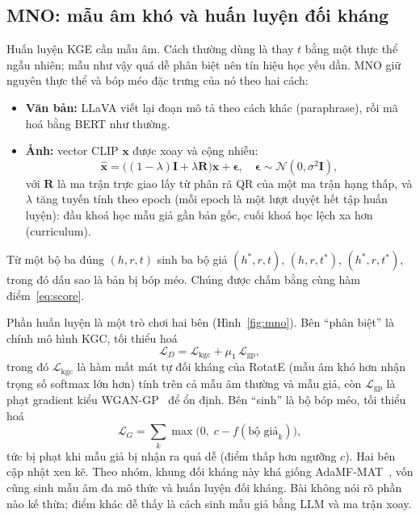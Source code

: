 \documentclass[conference,a4paper]{IEEEtran}
\begin{document}
\subsection{MNO: mẫu âm khó và huấn luyện đối kháng}
\label{sec:hfr-mno}

Huấn luyện KGE cần mẫu âm. Cách thường dùng là thay $t$ bằng một thực thể ngẫu nhiên; mẫu như vậy quá dễ phân biệt nên tín hiệu học yếu dần. MNO giữ nguyên thực thể và bóp méo đặc trưng của nó theo hai cách:

\begin{itemize}
\item \textbf{Văn bản:} LLaVA viết lại đoạn mô tả theo cách khác (paraphrase), rồi mã hoá bằng BERT như thường.
\item \textbf{Ảnh:} vector CLIP $\mathbf{x}$ được xoay và cộng nhiễu:
\begin{equation}
\hat{\mathbf{x}} = \big((1-\lambda)\mathbf{I} + \lambda\mathbf{R}\big)\mathbf{x} + \boldsymbol{\epsilon}, \quad \boldsymbol{\epsilon} \sim \mathcal{N}(0, \sigma^2 \mathbf{I}),
\label{eq:perturb}
\end{equation}
với $\mathbf{R}$ là ma trận trực giao lấy từ phân rã QR của một ma trận hạng thấp, và $\lambda$ tăng tuyến tính theo epoch (mỗi epoch là một lượt duyệt hết tập huấn luyện): đầu khoá học mẫu giả gần bản gốc, cuối khoá học lệch xa hơn (curriculum).
\end{itemize}

Từ một bộ ba đúng $(h, r, t)$ sinh ba bộ giả $(h^*, r, t)$, $(h, r, t^*)$, $(h^*, r, t^*)$, trong đó dấu sao là bản bị bóp méo. Chúng được chấm bằng cùng hàm điểm~\eqref{eq:score}.

Phần huấn luyện là một trò chơi hai bên (Hình~\ref{fig:mno}). Bên ``phân biệt'' là chính mô hình KGC, tối thiểu hoá
\begin{equation}
\mathcal{L}_D = \mathcal{L}_{\mathrm{kgc}} + \mu_1\,\mathcal{L}_{\mathrm{gp}},
\label{eq:ld}
\end{equation}
trong đó $\mathcal{L}_{\mathrm{kgc}}$ là hàm mất mát tự đối kháng của RotatE (mẫu âm khó hơn nhận trọng số softmax lớn hơn) tính trên cả mẫu âm thường và mẫu giả, còn $\mathcal{L}_{\mathrm{gp}}$ là phạt gradient kiểu WGAN-GP~\cite{wgangp} để ổn định. Bên ``sinh'' là bộ bóp méo, tối thiểu hoá
\begin{equation}
\mathcal{L}_G = \sum_{k} \max\big(0,\; c - f(\text{bộ giả}_k)\big),
\label{eq:lg}
\end{equation}
tức bị phạt khi mẫu giả bị nhận ra quá dễ (điểm thấp hơn ngưỡng $c$). Hai bên cập nhật xen kẽ. Theo nhóm, khung đối kháng này khá giống AdaMF-MAT~\cite{adamf}, vốn cũng sinh mẫu âm đa mô thức và huấn luyện đối kháng. Bài không nói rõ phần nào kế thừa; điểm khác dễ thấy là cách sinh mẫu giả bằng LLM và ma trận xoay.
\end{document}
